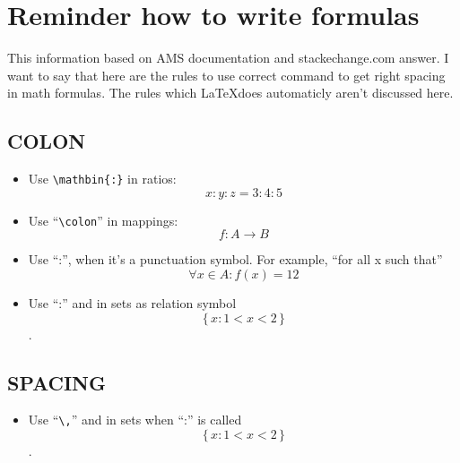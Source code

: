 \documentclass[a5paper,openany,9pt]{extbook}
\begin{document}
\chapter*{Reminder how to write formulas}

This information based on AMS documentation and stackechange.com answer. I want to say that here are the rules to use correct command to get right spacing in math formulas. The rules which \LaTeX does automaticly aren't discussed here.

\section{COLON}

\begin{itemize}
\item
Use \verb|\mathbin{:}| in ratios:
$$x\mathbin{:}y\mathbin{:}z = 3\mathbin{:}4\mathbin{:}5$$

\item
Use ``\verb=\colon='' in mappings:
$$f\colon A \to B$$

\item
Use ``:'', when it's a punctuation symbol. For example, ``for all x such that''
$$\forall x \in A\colon f(x) = 12$$

\item
Use ``:'' and in sets as relation symbol
$$\{\,x : 1 < x < 2\,\}$$.

\end{itemize}
	
\section{SPACING}

\begin{itemize}
\item
Use ``\verb=\,='' and in sets when ``:'' is called
$$\{\,x : 1 < x < 2\,\}$$.
\end{itemize}
\end{document}
